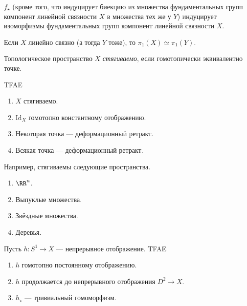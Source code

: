 \documentclass[12pt,a4paper]{article}
\newcommand{\Id}{\ensuremath{\mathrm{Id}}\xspace}
\begin{document}
    \begin{corollary}
        $f_\star$ (кроме того, что индуцирует биекцию из множества фундаментальных групп компонент линейной связности $X$ в множества тех же у $Y$) индуцирует изоморфизмы фундаментальных групп компонент линейной связности $X$.
    \end{corollary}

    \begin{corollary}
        Если $X$ линейно связно (а тогда $Y$ тоже), то $\pi_1(X) \simeq \pi_1(Y)$.
    \end{corollary}

    \begin{definition}
        Топологическое пространство $X$ \emph{стягиваемо}, если гомотопически эквивалентно точке.
    \end{definition}

    \begin{lemma}
        TFAE
        \begin{enumerate}
            \item $X$ стягиваемо.
            \item $\Id_X$ гомотопно константному отображению.
            \item Некоторая точка --- деформационный ретракт.
            \item Всякая точка --- деформационный ретракт.
        \end{enumerate}
    \end{lemma}

    \begin{example}
        Например, стягиваемы следующие пространства.
        \begin{enumerate}
            \item $\RR^n$.
            \item Выпуклые множества.
            \item Звёздные множества.
            \item Деревья.
        \end{enumerate}
    \end{example}

    \begin{lemma}
        Пусть $h: S^1 \to X$ --- непрерывное отображение. TFAE
        \begin{enumerate}
            \item $h$ гомотопно постоянному отображению.
            \item $h$ продолжается до непрерывного отображения $D^2 \to X$.
            \item $h_\star$ --- тривиальный гомоморфизм.
        \end{enumerate}
    \end{lemma}
\end{document}
